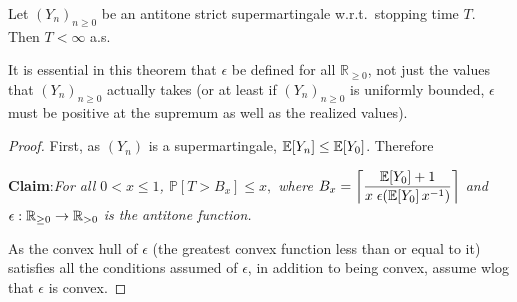 \begin{therm}
\label{thm:a-c strict}
Let $(Y_n)_{n \geq 0}$ be an antitone strict supermartingale w.r.t.~stopping time $T$. 
Then $T < \infty$ a.s.
\end{therm}

It is essential in this theorem that $\epsilon$ be defined for all $\mathbb R_{\geq 0}$, not just the values that $(Y_n)_{n \geq 0}$ actually takes (or at least if $(Y_n)_{n \geq 0}$ is uniformly bounded, $\epsilon$ must be positive at the supremum as well as the realized values). 

\begin{proof}
First, as $(Y_n)$ is a supermartingale, $\mathbb{E}[Y_n] \leq \mathbb{E}[Y_0]$. 
Therefore
\begin{calculation}
\end{calculation}

\noindent\textbf{Claim}:\emph{For all $0 < x \leq 1$, 
\(
\mathbb P[T > B_x] \leq x,
\)
where $B_x = \left \lceil \dfrac{\mathbb{E}[Y_0]+1}{x \; \epsilon(\mathbb{E}[Y_0] \, x^{-1})} \right \rceil$ and $\epsilon : \mathbb{R}_{{\geq}0} \to \mathbb{R}_{{>}0}$ is the antitone function.} 

\smallskip

As the convex hull of $\epsilon$ (the greatest convex function less than or equal to it) satisfies all the conditions assumed of $\epsilon$, in addition to being convex, assume wlog that $\epsilon$ is convex.


\end{proof}
